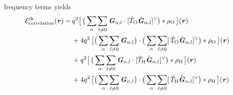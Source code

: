 \documentclass[aps,pre,preprint,unsortedaddress]{revtex4}
\renewcommand{\v}[1]{\textbf{\textit{#1}}}
\renewcommand{\d}[1]{\textsf{#1}}
\begin{document}
frequency terms yields
\begin{align}\nonumber
  \mathcal E^{\textrm{ik}}_{\textrm{correlation}}(\v r)
  =\,&
  q^2
  \big[\,
  \big(
  \sum_{\alpha} \sum_{l\neq 0}
  \v G_{\alpha,l}\cdot[\hat T_{\textrm{O}}\hat{\v G}_{\alpha,l}]^{\vee}
  \big)
  \ast \rho_{\textrm{O}}
  \,\big] (\v r) \\\nonumber
  \,&+
  4q^2\,
  \big[
  \big(
  \sum_{\alpha} \sum_{l\neq 0}  
  \v G_{\alpha,l}
  \big)
  \cdot
  \big(
  \sum_{\alpha} \sum_{l\neq 0}  
  [\,\hat T_{\textrm{O}}\hat{\v G}_{\alpha,l}]^{\vee}
  \big)
  \ast \rho_{\textrm{O}}\,
  \big] (\v r) \\\nonumber
  \,&+
  q^2
  \big[\,
  \big(
  \sum_{\alpha} \sum_{l\neq 0}
  \v G_{\alpha,l}\cdot[\hat T_{\textrm{H}}\hat{\v G}_{\alpha,l}]^{\vee}
  \big)
  \ast \rho_{\textrm{H}}
  \,\big] (\v r) \\
  \,&+
  4q^2\,
  \big[
  \big(
  \sum_{\alpha} \sum_{l\neq 0}  
  \v G_{\alpha,l}
  \big)
  \cdot
  \big(
  \sum_{\alpha} \sum_{l\neq 0}  
  [\,\hat T_{\textrm{H}}\hat{\v G}_{\alpha,l}]^{\vee}
  \big)
  \ast \rho_{\textrm{H}}\,
  \big] (\v r) 
\end{align}
\end{document}

